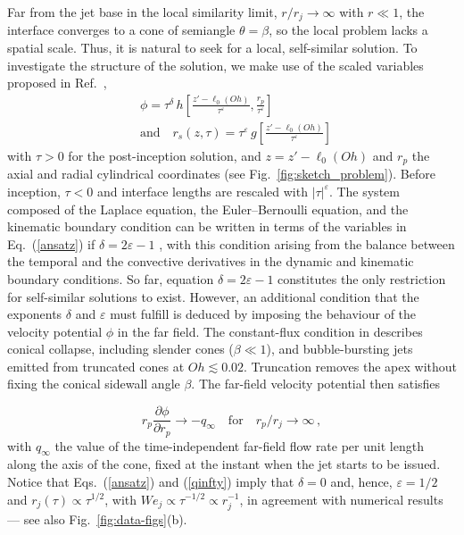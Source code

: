 \documentclass[aps,prl,reprint,floatfix]{revtex4-2}
\begin{document}
Far from the jet base in the local similarity limit, $r/r_j\rightarrow\infty$ with $r\ll1$, the interface converges to a cone of semiangle $\theta=\beta$, so the local problem lacks a spatial scale. Thus, it is natural to seek for a local, self-similar solution. To investigate the structure of the solution, we make use of the scaled variables proposed in Ref.~\cite{Zeff},
\begin{equation}
\begin{split}
&\phi=\tau^\delta\,h\left[\frac{z'-\ell_0(Oh)}{\tau^\varepsilon},\frac{r_p}{\tau^\varepsilon}\right] \\ &\mathrm{and}\quad
r_s(z,\tau)=\tau^\varepsilon\,g\left[\frac{z'-\ell_0(Oh)}{\tau^\varepsilon}\right]\, \label{ansatz}
\end{split}
\end{equation}
with $\tau>0$ for the post-inception solution, and $z=z'-\ell_0(Oh)$ and $r_p$ the axial and radial cylindrical coordinates (see Fig.~\ref{fig:sketch_problem}). Before inception, $\tau<0$ and interface lengths are rescaled with $|\tau|^\varepsilon$. The system composed of the Laplace equation, the Euler--Bernoulli equation, and the kinematic boundary condition can be written in terms of the variables in Eq.~(\ref{ansatz}) if $\delta=2\varepsilon-1$ \cite{Zeff}, with this condition arising from the balance between the temporal and the convective derivatives in the dynamic and kinematic boundary conditions. So far, equation $\delta=2\varepsilon-1$ constitutes the only restriction for self-similar solutions to exist. However, an additional condition that the exponents $\delta$ and $\varepsilon$ must fulfill is deduced by imposing the behaviour of the velocity potential $\phi$ in the far field. The constant-flux condition in \cite{PRF2023} describes conical collapse, including slender cones ($\beta\ll1$), and bubble-bursting jets emitted from truncated cones at $Oh\lesssim0.02$. Truncation removes the apex without fixing the conical sidewall angle $\beta$. The far-field velocity potential then satisfies

\begin{equation}
r_p\frac{\partial\phi}{\partial r_p}\rightarrow -q_\infty\quad\mathrm{for}\quad r_p/r_j\rightarrow\infty\, ,\label{qinfty}
\end{equation}
with $q_\infty$ the value of the time-independent far-field flow rate per unit length along the axis of the cone, fixed at the instant when the jet starts to be issued. Notice that Eqs.~(\ref{ansatz}) and (\ref{qinfty}) imply that $\delta=0$ and, hence, $\varepsilon=1/2$ and $r_j(\tau)\propto \tau^{1/2}$, with $We_j\propto \tau^{-1/2}\propto r^{-1}_j$, in agreement with numerical results \cite{PRF2023} --- see also Fig.~\ref{fig:data-figs}(b).
\end{document}
